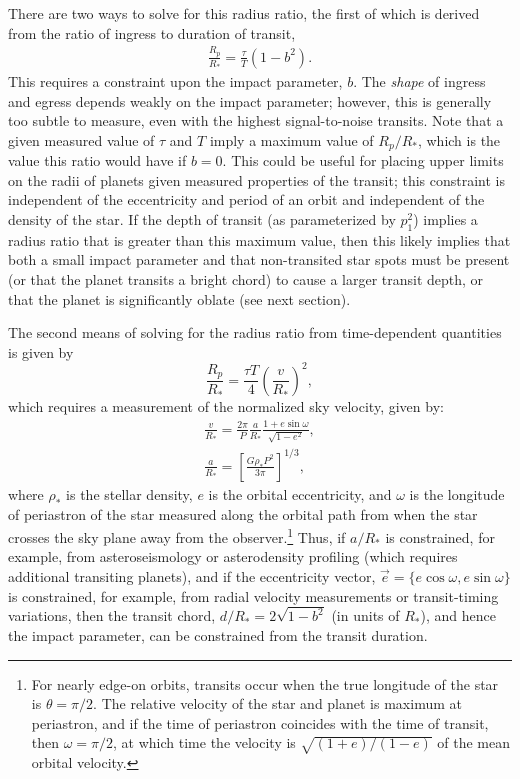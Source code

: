 There are two ways to solve for this radius ratio, the first of which is
derived from the ratio of ingress to duration of transit,
\begin{eqnarray}
 \frac{R_p}{R_*} = \frac{\tau}{T}(1-b^2). \label{eqn:rprs}
\end{eqnarray}
This requires a constraint upon the impact parameter, $b$.  The {\it shape}
of ingress and egress depends weakly on the impact parameter;  however, this
is generally too subtle to measure, even with the highest signal-to-noise
transits.  Note that a given measured value of $\tau$ and $T$ imply a
maximum value of $R_p/R_*$, which is the value this ratio would have
if $b=0$.  This could be useful for placing upper limits on the radii of
planets given measured properties of the transit;  this constraint is
independent of the eccentricity and period of an orbit and independent of the
density of the star.  If the depth of transit (as parameterized by
$p_1^2$) implies a radius ratio that is greater than this maximum value,
then this likely implies that both a small impact parameter and that non-transited
star spots must be present (or that the planet transits a bright chord)
to cause a larger transit depth, or that the planet is significantly oblate 
(see next section).

The second means of solving for the radius ratio from time-dependent
quantities is given by
\begin{equation}
\frac{R_p}{R_*} = \frac{\tau T}{4} \left(\frac{v}{R_*}\right)^2,
\end{equation}
which requires a measurement of the normalized sky velocity, given by:
\begin{eqnarray}
\frac{v}{R_*} = \frac{2\pi}{P}\frac{a}{R_*}\frac{1+e\sin{\omega}}{\sqrt{1-e^2}},\\
\frac{a}{R_*} = \left[\frac{G\rho_*P^2}{3\pi}\right]^{1/3},
\end{eqnarray}
where $\rho_*$ is the stellar density, $e$ is the orbital eccentricity, and
$\omega$ is the longitude of periastron of the star measured along the orbital path from
when the star crosses the sky plane away from the observer.\footnote{For nearly
edge-on orbits, transits
occur when the true longitude of the star is $\theta=\pi/2$.  The relative
velocity of the star and planet is maximum at periastron, and if the time of
periastron coincides with the time of transit, then $\omega = \pi/2$, at
which time the velocity is $\sqrt{(1+e)/(1-e)}$ of the mean orbital velocity.}
Thus, if $a/R_*$ is constrained, for example, from asteroseismology or asterodensity
profiling (which requires additional transiting planets), and if the
eccentricity vector, $\vec{e}=\{e\cos{\omega},e\sin{\omega}\}$ is constrained, 
for example, from radial velocity measurements
or transit-timing variations, then
the transit chord, $d/R_*=2\sqrt{1-b^2}$ (in units of $R_*$), and hence the impact
parameter, can be constrained from the transit duration.

